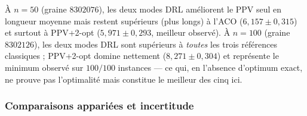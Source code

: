 \documentclass[12pt, a4paper, twoside, openright]{book}
\begin{document}
À $n=50$ (graine $8302076$), les deux modes DRL améliorent le PPV seul en longueur moyenne mais restent supérieurs (plus longs) à l'ACO ($6{,}157\pm0{,}315$) et surtout à PPV+2-opt ($5{,}971\pm0{,}293$, meilleur observé). À $n=100$ (graine $8302126$), les deux modes DRL sont supérieurs à \emph{toutes} les trois références classiques ; PPV+2-opt domine nettement ($8{,}271\pm0{,}304$) et représente le minimum observé sur $100/100$ instances --- ce qui, en l'absence d'optimum exact, ne prouve pas l'optimalité mais constitue le meilleur des cinq ici.

\subsubsection{Comparaisons appariées et incertitude}
\label{sec:eval-v1-1-paires}
\end{document}
